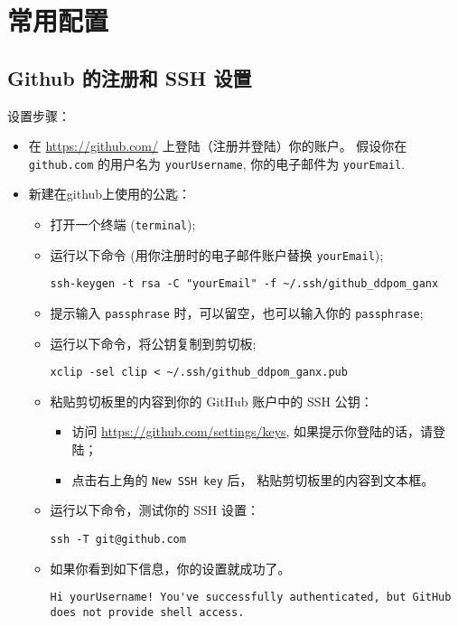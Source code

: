 \documentclass[cn,11pt, simple]{elegantbook}
\begin{document}
\section{常用配置}%
\label{sec:git-settings}

\subsection{Github 的注册和 SSH 设置}%
\label{sub:git-ssh}

设置步骤：
\begin{itemize}
    \item 在 \href{https://github.com/}{https://github.com/}
        上登陆（注册并登陆）你的账户。
        假设你在 \lstinline{github.com} 的用户名为 \lstinline{yourUsername},
        你的电子邮件为 \lstinline{yourEmail}.
    \item 新建在github上使用的公匙：
        \begin{itemize}
            \item 打开一个终端 (\lstinline{terminal});
            \item 运行以下命令 (用你注册时的电子邮件账户替换
                \lstinline{yourEmail});
\begin{lstlisting}
ssh-keygen -t rsa -C "yourEmail" -f ~/.ssh/github_ddpom_ganx
\end{lstlisting}
            \item 提示输入 \lstinline{passphrase}
                时，可以留空，也可以输入你的 \lstinline{passphrase};
            \item 运行以下命令，将公钥复制到剪切板;
\begin{lstlisting}
xclip -sel clip < ~/.ssh/github_ddpom_ganx.pub
\end{lstlisting}
            \item 粘贴剪切板里的内容到你的 GitHub 账户中的 SSH 公钥：
                \begin{itemize}
                    \item 访问 \href{https://github.com/settings/keys}
                        {https://github.com/settings/keys},
                        如果提示你登陆的话，请登陆；
                    \item 点击右上角的 \lstinline{New SSH key} 后，
                        粘贴剪切板里的内容到文本框。
                \end{itemize}
            \item 运行以下命令，测试你的 SSH 设置：
\begin{lstlisting}
ssh -T git@github.com
\end{lstlisting}
            \item 如果你看到如下信息，你的设置就成功了。
\begin{lstlisting}
Hi yourUsername! You've successfully authenticated, but GitHub does not provide shell access.
\end{lstlisting}
        \end{itemize}
\end{itemize}
\end{document}
